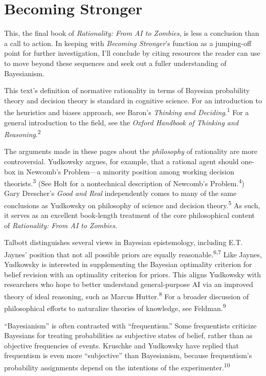 \part{Becoming Stronger}



{
 This, the final book of \textit{Rationality: From AI to Zombies},
is less a conclusion than a call to action. In keeping with
\textit{Becoming Stronger}'s function as a jumping-off
point for further investigation, I'll conclude by
citing resources the reader can use to move beyond these sequences and
seek out a fuller understanding of Bayesianism.}

{
 This text's definition of normative rationality in
terms of Bayesian probability theory and decision theory is standard in
cognitive science. For an introduction to the heuristics and biases
approach, see Baron's \textit{Thinking and
Deciding}.\textsuperscript{1} For a general introduction to the field,
see the \textit{Oxford Handbook of Thinking and
Reasoning}.\textsuperscript{2}}

{
 The arguments made in these pages about the \textit{philosophy} of
rationality are more controversial. Yudkowsky argues, for example, that
a rational agent should one-box in Newcomb's
Problem---a minority position among working decision
theorists.\textsuperscript{3} (See Holt for a nontechnical description
of Newcomb's Problem.\textsuperscript{4}) Gary
Drescher's \textit{Good and Real} independently comes
to many of the same conclusions as Yudkowsky on philosophy of science
and decision theory.\textsuperscript{5} As such, it serves as an
excellent book-length treatment of the core philosophical content of
\textit{Rationality: From AI to Zombies}.}

{
 Talbott distinguishes several views in Bayesian epistemology,
including E.T. Jaynes' position that not all possible
priors are equally reasonable.\textsuperscript{6,7} Like Jaynes,
Yudkowsky is interested in supplementing the Bayesian optimality
criterion for belief revision with an optimality criterion for priors.
This aligns Yudkowsky with researchers who hope to better understand
general-purpose AI via an improved theory of ideal reasoning, such as
Marcus Hutter.\textsuperscript{8} For a broader discussion of
philosophical efforts to naturalize theories of knowledge, see
Feldman.\textsuperscript{9}}

{
 ``Bayesianism'' is often
contrasted with ``frequentism.''
Some frequentists criticize Bayesians for treating probabilities as
subjective states of belief, rather than as objective frequencies of
events. Kruschke and Yudkowsky have replied that frequentism is even
more ``subjective'' than
Bayesianism, because frequentism's probability
assignments depend on the intentions of the
experimenter.\textsuperscript{10}}

